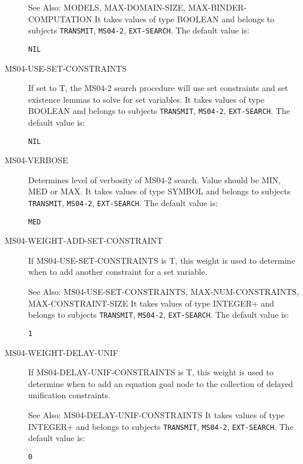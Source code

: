 \begin{description}
See Also: MODELS, MAX-DOMAIN-SIZE, MAX-BINDER-COMPUTATION
It takes values of type BOOLEAN and belongs to subjects \texttt{TRANSMIT}, \texttt{MS04-2}, \texttt{EXT-SEARCH}.  The default value is: \begin{lstlisting}
NIL
\end{lstlisting}

\item[MS04-USE-SET-CONSTRAINTS]  
If set to T, the MS04-2 search procedure will use set constraints
and set existence lemmas to solve for set variables.
It takes values of type BOOLEAN and belongs to subjects \texttt{TRANSMIT}, \texttt{MS04-2}, \texttt{EXT-SEARCH}.  The default value is: \begin{lstlisting}
NIL
\end{lstlisting}

\item[MS04-VERBOSE]  
Determines level of verbosity of MS04-2 search.
Value should be MIN, MED or MAX.
It takes values of type SYMBOL and belongs to subjects \texttt{TRANSMIT}, \texttt{MS04-2}, \texttt{EXT-SEARCH}.  The default value is: \begin{lstlisting}
MED
\end{lstlisting}

\item[MS04-WEIGHT-ADD-SET-CONSTRAINT]  
If MS04-USE-SET-CONSTRAINTS is T, this weight is used to determine
when to add another constraint for a set variable.

See Also: MS04-USE-SET-CONSTRAINTS, MAX-NUM-CONSTRAINTS, MAX-CONSTRAINT-SIZE
It takes values of type INTEGER+ and belongs to subjects \texttt{TRANSMIT}, \texttt{MS04-2}, \texttt{EXT-SEARCH}.  The default value is: \begin{lstlisting}
1
\end{lstlisting}

\item[MS04-WEIGHT-DELAY-UNIF]  
If MS04-DELAY-UNIF-CONSTRAINTS is T, this weight is used to determine
when to add an equation goal node to the collection of delayed
unification constraints.

See Also: MS04-DELAY-UNIF-CONSTRAINTS
It takes values of type INTEGER+ and belongs to subjects \texttt{TRANSMIT}, \texttt{MS04-2}, \texttt{EXT-SEARCH}.  The default value is: \begin{lstlisting}
0
\end{lstlisting}


\end{description}
